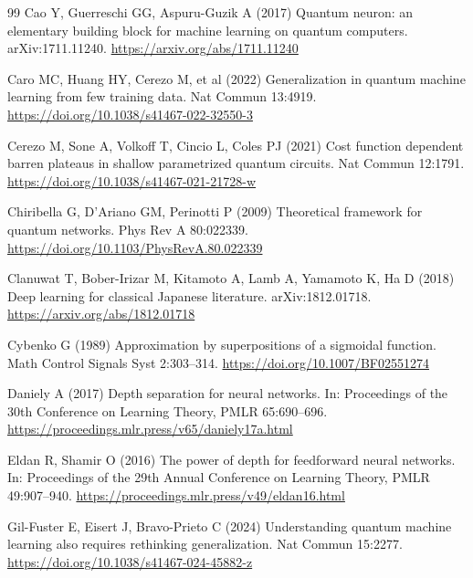 \documentclass[pdflatex,sn-mathphys,NameDate,iicol]{sn-jnl}
\begin{document}
\begin{thebibliography}{99}
Cao Y, Guerreschi GG, Aspuru-Guzik A (2017) Quantum neuron: an elementary
building block for machine learning on quantum computers.
arXiv:1711.11240. \url{https://arxiv.org/abs/1711.11240}

Caro MC, Huang HY, Cerezo M, et al (2022) Generalization in quantum machine
learning from few training data. Nat Commun 13:4919.
\url{https://doi.org/10.1038/s41467-022-32550-3}

Cerezo M, Sone A, Volkoff T, Cincio L, Coles PJ (2021) Cost function
dependent barren plateaus in shallow parametrized quantum circuits.
Nat Commun 12:1791.
\url{https://doi.org/10.1038/s41467-021-21728-w}

Chiribella G, D'Ariano GM, Perinotti P (2009) Theoretical framework for
quantum networks. Phys Rev A 80:022339.
\url{https://doi.org/10.1103/PhysRevA.80.022339}

Clanuwat T, Bober-Irizar M, Kitamoto A, Lamb A, Yamamoto K, Ha D (2018) Deep
learning for classical Japanese literature. arXiv:1812.01718.
\url{https://arxiv.org/abs/1812.01718}

Cybenko G (1989) Approximation by superpositions of a sigmoidal function.
Math Control Signals Syst 2:303--314.
\url{https://doi.org/10.1007/BF02551274}

Daniely A (2017) Depth separation for neural networks. In: Proceedings of
the 30th Conference on Learning Theory, PMLR 65:690--696.
\url{https://proceedings.mlr.press/v65/daniely17a.html}

Eldan R, Shamir O (2016) The power of depth for feedforward neural networks.
In: Proceedings of the 29th Annual Conference on Learning Theory, PMLR
49:907--940. \url{https://proceedings.mlr.press/v49/eldan16.html}

Gil-Fuster E, Eisert J, Bravo-Prieto C (2024) Understanding quantum machine
learning also requires rethinking generalization.
Nat Commun 15:2277.
\url{https://doi.org/10.1038/s41467-024-45882-z}


\end{thebibliography}
\end{document}

